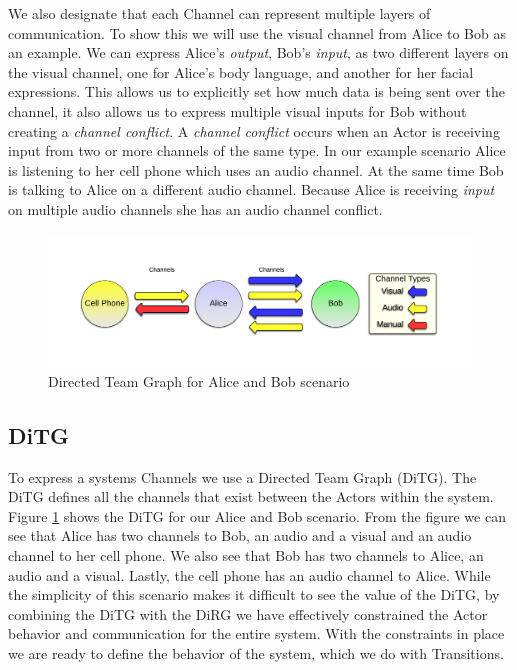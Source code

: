 We also designate that each Channel can represent multiple layers of communication.  To show this we will use the visual channel from Alice to Bob as an example.  We can express Alice's {\em output}, Bob's {\em input}, as two different layers on the visual channel, one for Alice's body language, and another for her facial expressions.  This allows us to explicitly set how much data is being sent over the channel, it also allows us to express multiple visual inputs for Bob without creating a {\em channel conflict}.  A {\em channel conflict} occurs when an Actor is receiving input from two or more channels of the same type.  In our example scenario Alice is listening to her cell phone which uses an audio channel.  At the same time Bob is talking to Alice on a different audio channel.  Because Alice is receiving {\em input} on multiple audio channels she has an audio channel conflict.  

\begin{figure}[h]
\begin{center}
\includegraphics[width=\textwidth]{ab_ditg.png}
\caption{Directed Team Graph for Alice and Bob scenario}
\label{fig:ab_ditg}
\end{center}
\end{figure}

\subsection{DiTG}
To express a systems Channels we use a Directed Team Graph (DiTG)\cite{FVHMS}.  The DiTG defines all the channels that exist between the Actors within the system.  Figure \ref{fig:ab_ditg} shows the DiTG for our Alice and Bob scenario.  From the figure we can see that Alice has two channels to Bob, an audio and a visual and an audio channel to her cell phone.  We also see that Bob has two channels to Alice, an audio and a visual.  Lastly, the cell phone has an audio channel to Alice.  While the simplicity of this scenario makes it difficult to see the value of the DiTG, by combining the DiTG with the DiRG we have effectively constrained the Actor behavior and communication for the entire system.  With the constraints in place we are ready to define the behavior of the system, which we do with Transitions.


